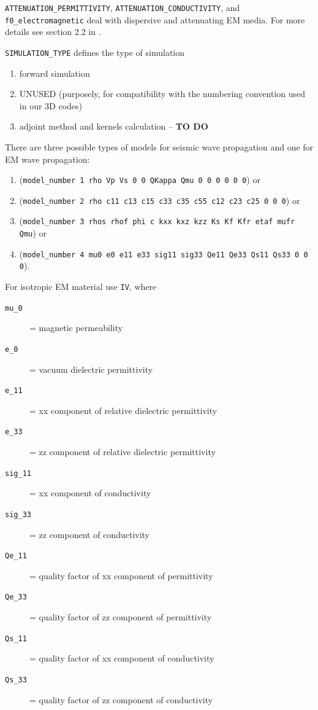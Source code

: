 \begin{description}[style=nextline, labelindent=1em, font=\normalfont]
\item[In section \textbf{"\# Attenuation"}:]
\texttt{ATTENUATION\_PERMITTIVITY}, \texttt{ATTENUATION\_CONDUCTIVITY}, and \texttt{f0\_electromagnetic} deal with dispersive and attenuating EM media.
For more details see section  2.2 in \cite{Morency20}.

\item[In section \textbf{"\# time step parameters"}:]
\texttt{SIMULATION\_TYPE} defines the type of simulation
  \begin{enumerate}[label=(\arabic*)]
    \item forward simulation
    \item UNUSED (purposely, for compatibility with the numbering convention used in our 3D codes)
    \item adjoint method and kernels calculation -- {\bf TO DO}
  \end{enumerate}

\item[In section \textbf{"\# define models...."}:]
There are three possible types of models for seismic wave propagation and one for EM wave propagation:
  \begin{enumerate}[label=\ttfamily \Roman*:]
    \item (\texttt{model\_number 1 rho Vp Vs 0 0 QKappa Qmu 0 0 0 0 0 0}) or
    \item (\texttt{model\_number 2 rho c11 c13 c15 c33 c35 c55 c12 c23 c25 0 0 0}) or
    \item (\texttt{model\_number 3 rhos rhof phi c kxx kxz kzz Ks Kf Kfr etaf mufr Qmu}) or
    \item (\texttt{model\_number 4 mu0 e0 e11 e33 sig11 sig33 Qe11 Qe33 Qs11 Qs33 0 0 0}).
  \end{enumerate}



For isotropic EM material use \texttt{IV}, where

\begin{description}
\item[{\texttt{mu\_0}}] = magnetic permeability
\item[{\texttt{e\_0}}] = vacuum dielectric permittivity
\item[{\texttt{e\_11}}] = xx component of relative dielectric permittivity
\item[{\texttt{e\_33}}] = zz component of relative dielectric permittivity
\item[{\texttt{sig\_11}}] = xx component of conductivity
\item[{\texttt{sig\_33}}] = zz component of conductivity 
\item[{\texttt{Qe\_11}}] = quality factor of xx component of permittivity
\item[{\texttt{Qe\_33}}] = quality factor of zz component of permittivity
\item[{\texttt{Qs\_11}}] = quality factor of xx component of conductivity
\item[{\texttt{Qs\_33}}] = quality factor of zz component of conductivity
\end{description}


\end{description}
